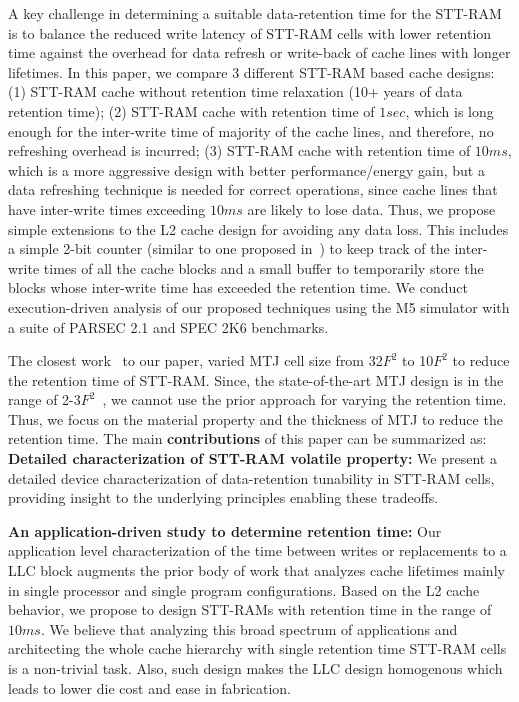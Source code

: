A key challenge in determining a suitable data-retention time for the STT-RAM is to balance the
reduced write latency of STT-RAM cells with lower retention time against the overhead for data refresh or
write-back of cache lines with longer lifetimes. In this paper, we compare 3 different STT-RAM based
cache designs: (1) STT-RAM cache without retention time relaxation (10+ years of data retention
time); (2) STT-RAM cache with retention time of $1sec$, which is long enough for the inter-write time of
majority of the cache lines, and therefore, no refreshing overhead is incurred; (3) STT-RAM cache with
retention time of $10ms$, which is a more aggressive design with better performance/energy gain, but a
data refreshing technique is needed for correct operations, since cache lines that have inter-write times
exceeding $10ms$ are likely to lose data. Thus, we propose simple extensions to the L2 cache design
for avoiding any data loss. This includes a simple 2-bit counter (similar to one proposed
in~\cite{cache-decay-2001}) to keep track of the inter-write times of all the cache blocks and a small buffer
to temporarily store the blocks whose inter-write time has exceeded the retention time. We conduct
execution-driven analysis of our proposed techniques using the M5 simulator with
a suite of PARSEC 2.1 and SPEC 2K6 benchmarks. 

The closest work~\cite{STTRAM:HPCA11} to our paper, varied MTJ cell size from 32$F^2$ to 10$F^2$ to reduce
the retention time of STT-RAM. Since, the state-of-the-art MTJ design is in the range of 2-3$F^2$~\cite{STTRAM:Grandis11}, we cannot use the prior approach for varying the retention time. Thus, we focus on
the material property and the thickness of MTJ to reduce the retention time. The main {\bf contributions} of this paper can be summarized as: \\
\noindent\textbf{Detailed characterization of STT-RAM volatile property:} We present a detailed
device characterization of data-retention tunability in STT-RAM cells, providing insight to the
underlying principles enabling these tradeoffs. 

\noindent\textbf{An application-driven study to determine retention time:}
Our application level characterization of the time between writes or replacements to a 
LLC block augments the prior body of work that analyzes cache lifetimes mainly
in single processor and single program configurations. Based on the L2 cache behavior, 
we propose to design STT-RAMs with retention time in the range of $10ms$.
We believe that analyzing this broad spectrum of applications
and architecting the whole cache hierarchy with single retention time STT-RAM
cells is a non-trivial task. Also, such design 
makes the LLC design homogenous which leads to lower die cost and ease in fabrication.

